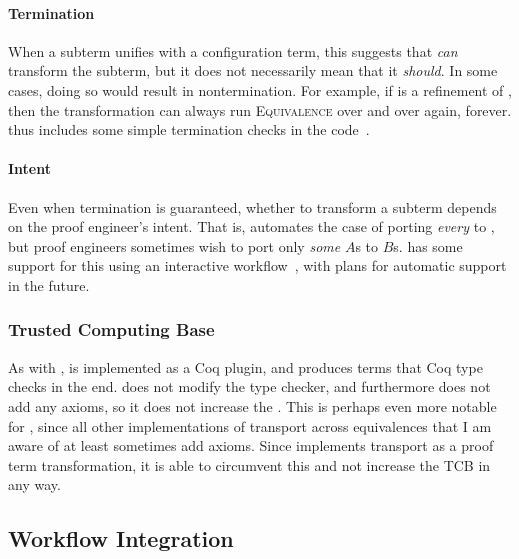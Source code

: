 \paragraph{Termination}
When a subterm unifies with a configuration term, this suggests that \toolnamec \textit{can}
transform the subterm, but it does not necessarily mean that it \textit{should}.
In some cases, doing so would result in nontermination.
For example, if \B is a refinement of \Aa, then the transformation can always run \textsc{Equivalence}
over and over again, forever.
\toolnamec thus includes some simple termination checks in the code~\href{https://github.com/uwplse/pumpkin-pi/blob/v2.0.0/plugin/src/automation/lift/liftrules.ml}{}. %

\paragraph{Intent}
Even when termination is guaranteed, whether to transform a subterm depends on the proof engineer's intent.
That is, \toolnamec automates the case of porting \textit{every} \Aa to \B,
but proof engineers sometimes wish to port only \textit{some} $A$s to $B$s.
\toolnamec has some support for this using an interactive workflow~\href{https://github.com/uwplse/pumpkin-pi/blob/v2.0.0/plugin/coq/minimal_records.v}{},
with plans for automatic support in the future. %

\subsubsection{Trusted Computing Base}
\label{sec:pi-tcb}

As with \sysname, \toolnamec is implemented as a Coq plugin, and produces terms that Coq type checks in the end.
\toolnamec does not modify the type checker, and furthermore does not add any axioms, so it does not increase the .
This is perhaps even more notable for \toolnamec, since all other implementations of transport across equivalences
that I am aware of at least sometimes add axioms.
Since \toolnamec implements transport as a proof term transformation, it is able to circumvent this and not increase the TCB in any way.

\subsection{Workflow Integration}
\label{sec:pi-workflow}

